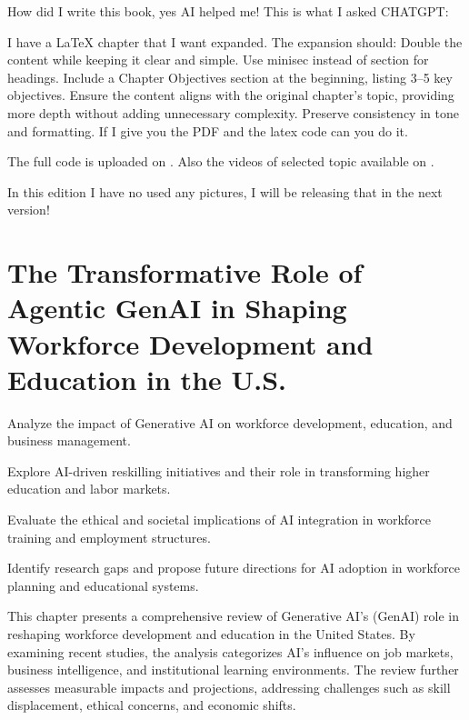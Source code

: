 \documentclass[a4paper,headinclude=on,footinclude=on,12pt,oneside]{scrbook}
\begin{document}
How did I write this book, yes AI helped me!
This is what I asked CHATGPT:

I have a LaTeX chapter that I want expanded. The expansion should:
Double the content while keeping it clear and simple.
Use minisec instead of section for headings.
Include a Chapter Objectives section at the beginning, listing 3–5 key objectives.
Ensure the content aligns with the original chapter's topic, providing more depth without adding unnecessary complexity.
Preserve consistency in tone and formatting.
If I give you the PDF and the latex code can you do it.


The full code is uploaded on \cite{JoshiGit2025}.
Also the videos of selected topic available on \cite{JoshiYouTube2025}.

In this edition I have no used any pictures, I will be releasing that in the  next version!  






\chapter{The Transformative Role of Agentic GenAI in Shaping Workforce Development and Education in the U.S.}

\begin{arrows}
	\item Analyze the impact of Generative AI on workforce development, education, and business management.
	\item Explore AI-driven reskilling initiatives and their role in transforming higher education and labor markets.
	\item Evaluate the ethical and societal implications of AI integration in workforce training and employment structures.
	\item Identify research gaps and propose future directions for AI adoption in workforce planning and educational systems.
	

	
	
	
\end{arrows}

This chapter presents a comprehensive review of Generative AI's (GenAI) role in reshaping workforce development and education in the United States. By examining recent studies, the analysis categorizes AI's influence on job markets, business intelligence, and institutional learning environments. The review further assesses measurable impacts and projections, addressing challenges such as skill displacement, ethical concerns, and economic shifts.
\end{document}
